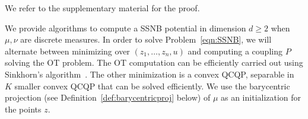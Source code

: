 

We refer to the supplementary material for the proof.

We provide algorithms to compute a SSNB potential in dimension $d \geq 2$ when $\mu,\nu$ are discrete measures. In order to solve Problem~\eqref{eqn:SSNB}, we will alternate between minimizing over $(z_1, \ldots, z_n, u)$ and computing a coupling $P$ solving the OT problem. The OT computation can be efficiently carried out using Sinkhorn's algorithm~\citep{CuturiSinkhorn}. The other minimization is a convex QCQP, separable in $K$ smaller convex QCQP that can be solved efficiently. We use the barycentric projection (see Definition~\ref{def:barycentricproj} below) of $\mu$ as an initialization for the points $z$.